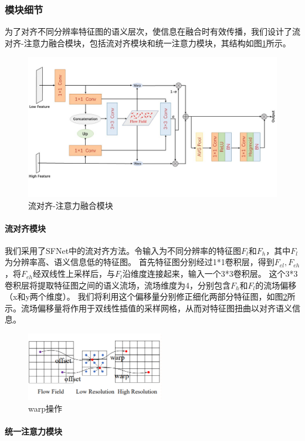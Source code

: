 \documentclass[11pt]{article}
\begin{document}
\subsubsection{模块细节}
为了对齐不同分辨率特征图的语义层次，使信息在融合时有效传播，我们设计了流对齐-注意力融合模块，包括流对齐模块和统一注意力模块，其结构如图\ref{fig:3}所示。
\begin{figure}[!h]
  \centering
  \includegraphics[width=12cm]{cusfuse.png}

  \centering
  \caption{流对齐-注意力融合模块}
  \label{fig:3}
\end{figure}
\paragraph{流对齐模块}
我们采用了SFNet中的流对齐方法。令输入为不同分辨率的特征图$F_l$和$F_h$，其中$F_l$为分辨率高、语义信息低的特征图。
首先特征图分别经过1*1卷积层，得到$F_{el},F_{eh}$，将$F_{eh}$经双线性上采样后，与$F_l$沿维度连接起来，输入一个3*3卷积层。
这个3*3卷积层将提取特征图之间的语义流场，流场维度为4，分别包含$F_h$和$F_l$的流场偏移（x和y两个维度）。
我们将利用这个偏移量分别修正细化两部分特征图，如图\ref{fig:4}所示。流场偏移量将作用于双线性插值的采样网格，从而对特征图扭曲以对齐语义信息。
\begin{figure}[h]
  \centering
  \includegraphics[width=6cm]{1.png}

  \centering
  \caption{warp操作\cite{ref34}}
  \label{fig:4}
\end{figure}

\paragraph{统一注意力模块}
\end{document}
